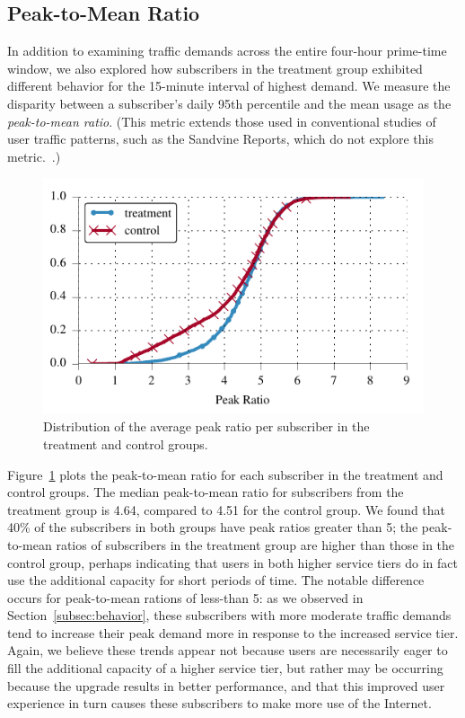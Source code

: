 \subsection{Peak-to-Mean Ratio}\label{subsec:peakratio}

In addition to examining traffic demands across the entire four-hour
prime-time window, we also explored how subscribers in the treatment
group exhibited different behavior for the 15-minute interval of highest
demand. We measure the disparity between a subscriber's daily 95th percentile and 
the mean usage as the \emph{peak-to-mean ratio}. (This metric extends those used
in conventional studies of user traffic patterns, such as the Sandvine
Reports, which do not explore this metric.~\cite{sandvine20141h}.) 

\begin{figure}[t]
\begin{minipage}{1\linewidth}
\centering
\includegraphics[width=1\linewidth]{figures/peakratio_cdf_mean-devices.pdf}
\caption{Distribution of the average peak ratio per subscriber in the treatment and 
control groups.}
\label{fig:CDF-peak-ratio-mean}
\end{minipage}
\end{figure}

Figure~\ref{fig:CDF-peak-ratio-mean} plots the peak-to-mean ratio for each 
subscriber in the treatment and control groups. The median peak-to-mean
ratio for subscribers from the treatment group is 4.64, compared to 4.51
for the control group.
We found that 40\% of the subscribers in both groups have peak ratios
greater than 5; the peak-to-mean ratios 
of subscribers in the treatment group are higher than those in the
control group, perhaps indicating that users in both higher service tiers do
in fact use the additional capacity for short periods of time.  \f{The
notable difference occurs for peak-to-mean rations of less-than 5: as
we observed in Section~\ref{subsec:behavior}, these subscribers with more
moderate traffic demands tend to increase their peak demand more in
response to the increased service tier.  Again, we believe these trends
appear not because users are necessarily eager to fill the additional
capacity of a higher service tier, but rather may be occurring because the upgrade
results in better performance, and that this improved user experience in
turn causes these subscribers to make more use of the Internet.}

